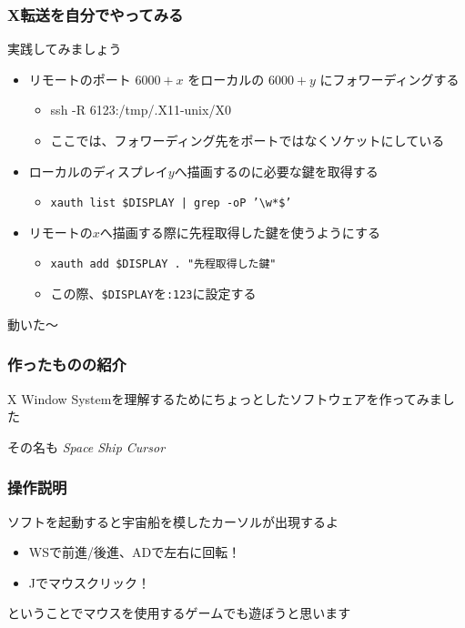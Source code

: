 \documentclass{beamer}
\begin{document}
\begin{frame}
  \frametitle{X転送を自分でやってみる}
  実践してみましょう
  \begin{itemize}
  \item リモートのポート $6000 + x$ をローカルの $6000 + y$ にフォワーディングする
    \begin{itemize}
    \item<2-> ssh -R 6123:/tmp/.X11-unix/X0
    \item<2-> \textreferencemark ここでは、フォワーディング先をポートではなくソケットにしている
    \end{itemize}
  \item ローカルのディスプレイ$y$へ描画するのに必要な鍵を取得する
    \begin{itemize}
    \item<3-> \texttt{xauth list \$DISPLAY | grep -oP '\textbackslash w*\$'}
    \end{itemize}
  \item リモートの$x$へ描画する際に先程取得した鍵を使うようにする
    \begin{itemize}
    \item<4-> \texttt{xauth add \$DISPLAY . "先程取得した鍵"}
    \item <4-> この際、\texttt{\$DISPLAY}を\texttt{:123}に設定する
    \end{itemize}
  \end{itemize}
\end{frame}

\begin{frame}[c]{}
  \centering
  動いた〜
\end{frame}

\begin{frame}
  \frametitle{作ったものの紹介}
  X Window Systemを理解するためにちょっとしたソフトウェアを作ってみました

  \pause

  その名も \textit{Space Ship Cursor}
\end{frame}

\begin{frame}
  \frametitle{操作説明}
  ソフトを起動すると宇宙船を模したカーソルが出現するよ
  \begin{itemize}
  \item WSで前進/後進、ADで左右に回転！
  \item Jでマウスクリック！
  \end{itemize}
  \pause
  ということでマウスを使用するゲームでも遊ぼうと思います
\end{frame}
\end{document}
